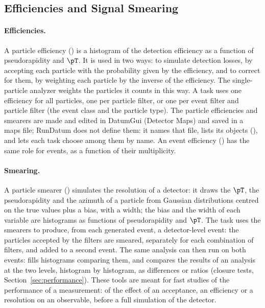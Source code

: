 \subsection{Efficiencies and Signal Smearing}
\label{sec:efficiency}

\paragraph{Efficiencies.}
A particle efficiency () is a histogram of the detection efficiency as a function of
pseudorapidity and $\pT$. It is used in two ways: to simulate detection losses, by accepting each particle with the
probability given by the efficiency, and to correct for them, by weighting each particle by the inverse of the
efficiency. The single-particle analyzer weights the particles it counts in this way. A task uses one efficiency for
all particles, one per particle filter, or one per event filter and particle filter (the event class and the particle
type). The particle efficiencies and smearers are made and edited in DatumGui (Detector Maps) and saved in a maps file;
RunDatum does not define them: it names that file, lists its objects (), and lets each task choose
among them by name. An event efficiency () has the same role for events, as a
function of their multiplicity.

\paragraph{Smearing.}
A particle smearer () simulates the resolution of a detector: it draws the $\pT$, the
pseudorapidity and the azimuth of a particle from Gaussian distributions centred on the true values plus a bias, with
a width; the bias and the width of each variable are histograms as functions of pseudorapidity and $\pT$. The task
 uses the smearers to produce, from each generated event, a detector-level event: the
particles accepted by the filters are smeared, separately for each combination of filters, and added to a second
event. The same analysis can then run on both events:  fills histograms comparing them, and
 compares the results of an analysis at the two levels, histogram by histogram, as differences
or ratios (closure tests, Section~\ref{sec:performance}). These tools are meant for fast studies of the performance of
a measurement: of the effect of an acceptance, an efficiency or a resolution on an observable, before a full simulation
of the detector.

